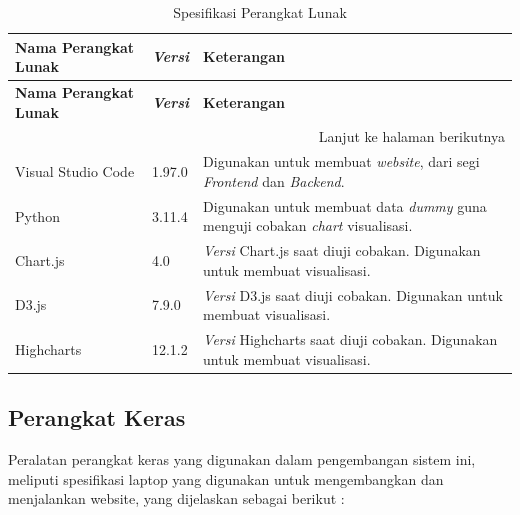 \begin{longtable}{|p{}|
		p{}|
		p{}|}
	\caption{Spesifikasi Perangkat Lunak} \label{t_risetPemodelan} \\
	
	\hline
	\textbf{Nama Perangkat Lunak} & \textbf{\textit{Versi}} & \textbf{Keterangan} \\ \hline
	\endfirsthead
	
	\hline
	\textbf{Nama Perangkat Lunak} & \textbf{\textit{Versi}} & \textbf{Keterangan} \\ \hline
	\endhead
	
	\hline \multicolumn{3}{r}{{Lanjut ke halaman berikutnya}} \\ 
	\endfoot
	
	\hline
	\endlastfoot
	
	Visual Studio Code & 1.97.0 & Digunakan untuk membuat \textit{website}, dari segi \textit{Frontend} dan \textit{Backend}. \\ \hline
	
	Python & 3.11.4 & Digunakan untuk membuat data \textit{dummy} guna menguji cobakan \textit{chart} visualisasi. \\ \hline
	
	Chart.js & 4.0 & \textit{Versi} Chart.js saat diuji cobakan. Digunakan untuk membuat visualisasi. \\ \hline
	
	D3.js & 7.9.0 & \textit{Versi} D3.js saat diuji cobakan. Digunakan untuk membuat visualisasi. \\ \hline
	
	Highcharts & 12.1.2 & \textit{Versi} Highcharts saat diuji cobakan. Digunakan untuk membuat visualisasi. \\ \hline
	
\end{longtable}


\subsection{Perangkat Keras}
Peralatan perangkat keras yang digunakan dalam pengembangan sistem ini, meliputi spesifikasi laptop yang digunakan untuk mengembangkan dan menjalankan website, yang dijelaskan sebagai berikut :  


